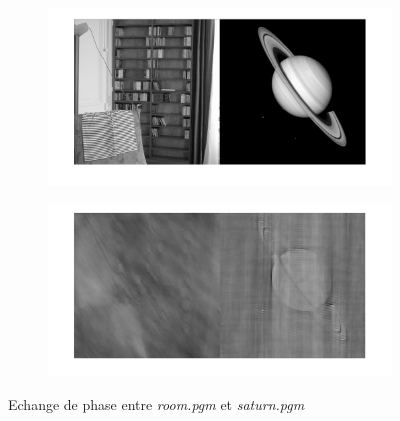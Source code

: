 \documentclass[12pt,a4paper,onecolumn]{article}
\begin{document}
\begin{figure}[H]
	\centering
	\begin{subfigure}[b]{\textwidth}
		\centering
		\includegraphics[height = 0.30\textheight]{10_1_11}
		\label{10_1_11}
	\end{subfigure}
	\vspace{2cm}
	\begin{subfigure}[b]{\textwidth}
		\centering
		\includegraphics[height = 0.30\textheight]{10_1_12}
		\label{10_1_12}
	\end{subfigure}
	\caption{Echange de phase entre \textit{room.pgm} et \textit{saturn.pgm}}
	\label{10_1}
\end{figure}
\end{document}
